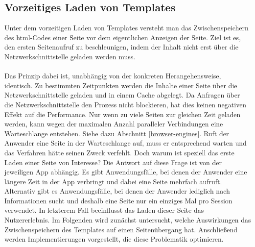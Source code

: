 \subsection{Vorzeitiges Laden von Templates}
\label{pt-tp-main}
Unter dem vorzeitigen Laden von \glspl{Template} versteht man das Zwischenspeichern des \gls{html}-Codes einer Seite vor dem eigentlichen Anzeigen der Seite. Ziel ist es, den ersten Seitenaufruf zu beschleunigen, indem der Inhalt nicht erst über die Netzwerkschnittstelle geladen werden muss. 
\\\\
Das Prinzip dabei ist, unabhängig von der konkreten Herangehensweise, identisch. Zu bestimmten Zeitpunkten werden die Inhalte einer Seite über die Netzwerkschnittstelle geladen und in einem Cache abgelegt. Da Anfragen über die Netzwerkschnittstelle den Prozess nicht blockieren, hat dies keinen negativen Effekt auf die Performance. Nur wenn zu viele Seiten zur gleichen Zeit geladen werden, kann wegen der maximalen Anzahl paralleler Verbindungen eine Warteschlange entstehen. Siehe dazu Abschnitt \ref{browser-engines}. Ruft der Anwender eine Seite in der Warteschlange auf, muss er entsprechend warten und das Verfahren hätte seinen Zweck verfehlt. Doch warum ist speziell das erste Laden einer Seite von Interesse? Die Antwort auf diese Frage ist von der jeweiligen App abhängig. Es gibt Anwendungsfälle, bei denen der Anwender eine längere Zeit in der App verbringt und dabei eine Seite mehrfach aufruft. Alternativ gibt es Anwendungsfälle, bei denen der Anwender lediglich nach Informationen sucht und deshalb eine Seite nur ein einziges Mal pro Session verwendet. In letzterem Fall beeinflusst das Laden dieser Seite das Nutzererlebnis. Im Folgenden wird zunächst untersucht, welche Auswirkungen das Zwischenspeichern des \glspl{Template} auf einen Seitenübergang hat. Anschließend werden Implementierungen vorgestellt, die diese Problematik optimieren. 

